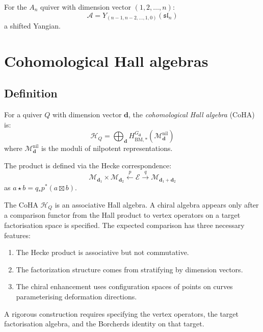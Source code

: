 \begin{example}\label{ex:coulomb-an}
For the $A_n$ quiver with dimension vector $(1, 2, \ldots, n)$:
\[
\mathcal{A} = Y_{(n-1, n-2, \ldots, 1, 0)}(\mathfrak{sl}_n)
\]
a shifted Yangian.
\end{example}


\section{Cohomological Hall algebras}
\label{sec:coha}

\subsection{Definition}

\begin{definition}\label{def:coha}
For a quiver $Q$ with dimension vector $\mathbf{d}$, the \emph{cohomological Hall algebra} (CoHA) is:
\[
\mathcal{H}_Q = \bigoplus_{\mathbf{d}} H^{G_{\mathbf{d}}}_{\mathrm{BM},*}(\mathcal{M}_{\mathbf{d}}^{\mathrm{nil}})
\]
where $\mathcal{M}_{\mathbf{d}}^{\mathrm{nil}}$ is the moduli of nilpotent representations.

The product is defined via the Hecke correspondence:
\[
\mathcal{M}_{\mathbf{d}_1} \times \mathcal{M}_{\mathbf{d}_2} \xleftarrow{p} \mathcal{E} \xrightarrow{q} \mathcal{M}_{\mathbf{d}_1 + \mathbf{d}_2}
\]
as $a \star b = q_* p^*(a \boxtimes b)$.
\end{definition}

\begin{conjecture}\label{conj:coha-e1}
The CoHA $\mathcal{H}_Q$ is an associative Hall algebra. A chiral
algebra appears only after a comparison functor from the Hall product
to vertex operators on a target factorisation space is specified.
The expected comparison has three necessary features:
\begin{enumerate}[label=(\roman*)]
\item The Hecke product is associative but not commutative.
\item The factorization structure comes from stratifying by dimension vectors.
\item The chiral enhancement uses configuration spaces of points on curves
parameterising deformation directions.
\end{enumerate}
A rigorous construction requires specifying the vertex operators, the
target factorisation algebra, and the Borcherds identity on that target.
\end{conjecture}

